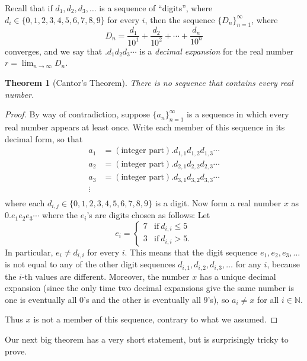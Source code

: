 \documentclass[12pt]{amsart}
\newcommand{\N}{\mathbb{N}}
\numberwithin{equation}{section}
\theoremstyle{plain} %
\newtheorem{thm}[equation]{Theorem}
\theoremstyle{definition}
\theoremstyle{remark}
\begin{document}
Recall that if $d_1,d_2,d_3,\dots$ is a sequence of ``digits'', where $d_i\in\{0,1,2,3,4,5,6,7,8,9\}$ for every $i$, then the sequence $\{D_n\}_{n=1}^\infty$, where 
\[ D_n = \frac{d_1}{10^1} + \frac{d_2}{10^2} + \cdots + \frac{d_n}{10^n}\]
converges, and we say that $.d_1d_2d_3\cdots$ is a \textit{decimal expansion} for the real number $r=\lim_{n\to \infty} D_n$.




\begin{thm}[Cantor's Theorem] There is no sequence that contains every real number.
\end{thm}

\begin{proof} By way of contradiction, suppose $\{a_n\}_{n=1}^\infty$ is a sequence in which every real number appears at least once.
	Write each member of this sequence in
	its decimal form, so that
	$$
	\begin{aligned}
	a_1 & = (\text{integer part}). d_{1,1} d_{1,2} d_{1,3} \cdots \\
	a_2 & = (\text{integer part}). d_{2,1} d_{2,2} d_{2,3} \cdots \\
	a_3 & = (\text{integer part}). d_{3,1} d_{3,2} d_{3,3} \cdots \\
	\vdots & \\
	\end{aligned}
	$$
	where each $d_{i,j}\in \{0,1,2,3,4,5,6,7,8,9\}$ is a digit. Now form a real number $x$ as $0.e_1 e_2 e_3 \cdots$ where the $e_i$'s are digits chosen as follows: 
	Let 
	\[e_i=\begin{cases} 7 & \text{if} \ d_{i,i}\leq 5\\
	3 & \text{if}\ d_{i,i}> 5.\end{cases}\]
	 In particular, $e_i\neq d_{i,i}$ for every $i$. This means that the digit sequence $e_1,e_2,e_3,\dots$ is not equal to any of the other digit sequences $d_{i,1}, d_{i,2},d_{i,3},\dots$ for any $i$, because the $i$-th values are different. Moreover, the number $x$ has a unique decimal expansion (since the only time two decimal expansions give the same number is one is eventually all $0$'s and the other is eventually all $9$'s), so $a_i \neq x$ for all $i\in \N$.
		
	Thus $x$ is not a member of this sequence, contrary to what we assumed. 
\end{proof}



Our next big theorem has a very short statement, but is surprisingly tricky to prove.
\end{document}
